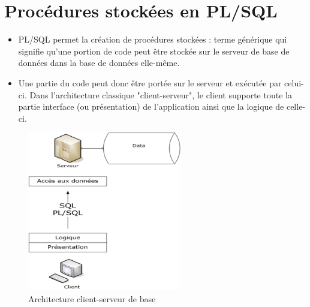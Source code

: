 \documentclass[10pt]{beamer}
\begin{document}
\section{Procédures stockées en PL/SQL}
\begin{frame}{\secname}
    \begin{itemize}
        \item PL/SQL permet la création de procédures stockées : terme générique qui signifie qu'une portion de code peut être stockée sur le serveur de base de données dans la base de données elle-même.
        \item Une partie du code peut donc être portée sur le serveur et exécutée par celui-ci. Dans l'architecture classique "client-serveur", le client supporte toute la partie interface (ou présentation) de l'application ainsi que la logique de celle-ci.
    \end{itemize}
\end{frame}

\begin{frame}{\secname}
    \begin{figure}
        \begin{center}
            \includegraphics[width=0.6\textwidth]{../assets/img/client_serveur.png}
            \caption{Architecture client-serveur de base}
        \end{center}
    \end{figure}
\end{frame}
\end{document}
